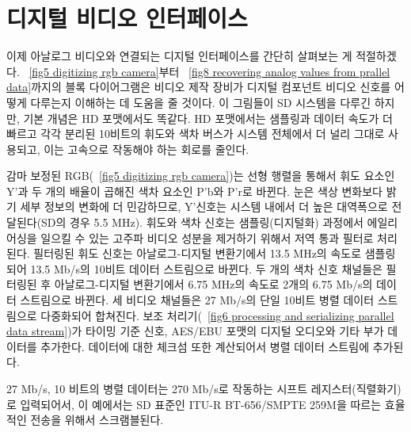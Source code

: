\chapter{디지털 비디오 인터페이스}
이제 아날로그 비디오와 연결되는 디지털 인터페이스를 간단히 살펴보는 게 적절하겠다.
\figurename~\ref{fig5 digitizing rgb camera}부터 \figurename~\ref{fig8 recovering analog values from prallel data}까지의 블록 다이어그램은 비디오 제작 장비가 디지털 컴포넌트 비디오 신호를 어떻게 다루는지 이해하는 데 도움을 줄 것이다.
이 그림들이 SD 시스템을 다루긴 하지만, 기본 개념은 HD 포맷에서도 똑같다. HD 포맷에서는 샘플링과 데이터 속도가 더 빠르고 각각 분리된 10비트의 휘도와 색차 버스가 시스템 전체에서 더 널리 그대로 사용되고, 이는 고속으로 작동해야 하는 회로를 줄인다.


감마 보정된 RGB(\figurename~\ref{fig5 digitizing rgb camera})는 선형 행렬을 통해서 휘도 요소인 Y'과 두 개의 배율이 곱해진 색차 요소인 P'b와 P'r로 바뀐다.
눈은 색상 변화보다 밝기 세부 정보의 변화에 더 민감하므로, Y'신호는 시스템 내에서 더 높은 대역폭으로 전달된다(SD의 경우 5.5 MHz).
휘도와 색차 신호는 샘플링(디지털화) 과정에서 에일리어싱을 일으킬 수 있는 고주파 비디오 성분을 제거하기 위해서 저역 통과 필터로 처리된다.
필터링된 휘도 신호는 아날로그-디지털 변환기에서 13.5 MHz의 속도로 샘플링되어 13.5 Mb/s의 10비트 데이터 스트림으로 바뀐다.
두 개의 색차 신호 채널들은 필터링된 후 아날로그-디지털 변환기에서 6.75 MHz의 속도로 2개의 6.75 Mb/s의 데이터 스트림으로 바뀐다.
세 비디오 채널들은 27 Mb/s의 단일 10비트 병렬 데이터 스트림으로 다중화되어 합쳐진다.
보조 처리기(\figurename~\ref{fig6 processing and serializing parallel data stream})가 타이밍 기준 신호, AES/EBU 포맷의 디지털 오디오와 기타 부가 데이터를 추가한다. 데이터에 대한 체크섬 또한 계산되어서 병렬 데이터 스트림에 추가된다.


27 Mb/s, 10 비트의 병렬 데이터는 270 Mb/s로 작동하는 시프트 레지스터(직렬화기)로 입력되어서, 이 예에서는 SD 표준인 ITU-R BT-656/SMPTE 259M을 따르는 효율적인 전송을 위해서 스크램블된다.


